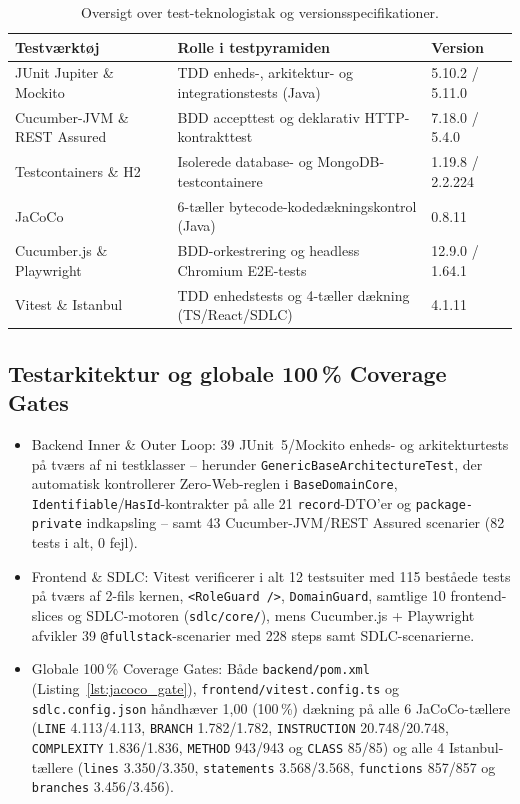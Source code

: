 \documentclass[11pt,a4paper]{article}
\begin{document}
\begin{table}[htbp]
\begin{table}[htbp]
\centering
\small
\begin{tabularx}{\textwidth}{P{4.2cm} Y P{2.4cm}}
\toprule
\textbf{Testværktøj} & \textbf{Rolle i testpyramiden} & \textbf{Version} \\
\midrule
JUnit Jupiter \& Mockito & TDD enheds-, arkitektur- og integrationstests (Java) & 5.10.2 / 5.11.0 \\
Cucumber-JVM \& REST Assured & BDD accepttest og deklarativ HTTP-kontrakttest & 7.18.0 / 5.4.0 \\
Testcontainers \& H2 & Isolerede database- og MongoDB-testcontainere & 1.19.8 / 2.2.224 \\
JaCoCo & 6-tæller bytecode-kodedækningskontrol (Java) & 0.8.11 \\
Cucumber.js \& Playwright & BDD-orkestrering og headless Chromium E2E-tests & 12.9.0 / 1.64.1 \\
Vitest \& Istanbul & TDD enhedstests og 4-tæller dækning (TS/React/SDLC) & 4.1.11 \\
\bottomrule
\end{tabularx}
\caption{Oversigt over test-teknologistak og versionsspecifikationer.}
\label{tab:test_stack}
\end{table}

\subsection{Testarkitektur og globale 100\,\% Coverage Gates}
\begin{itemize}[noitemsep]
    \item Backend Inner \& Outer Loop: 39 JUnit~5/Mockito enheds- og arkitekturtests på tværs af ni testklasser -- herunder \texttt{GenericBaseArchitectureTest}, der automatisk kontrollerer Zero-Web-reglen i \texttt{BaseDomainCore}, \texttt{Identifiable}/\texttt{HasId}-kontrakter på alle 21 \texttt{record}-DTO'er og \texttt{package-private} indkapsling -- samt 43 Cucumber-JVM/REST Assured scenarier (82 tests i alt, 0 fejl).
    \item Frontend \& SDLC: Vitest verificerer i alt 12 testsuiter med 115 beståede tests på tværs af 2-fils kernen, \texttt{<RoleGuard />}, \texttt{DomainGuard}, samtlige 10 frontend-slices og SDLC-motoren (\texttt{sdlc/core/}), mens Cucumber.js + Playwright afvikler 39 \texttt{@fullstack}-scenarier med 228 steps samt SDLC-scenarierne.
    \item Globale 100\,\% Coverage Gates: Både \texttt{backend/pom.xml} (Listing~\ref{lst:jacoco_gate}), \texttt{frontend/\allowbreak vitest.config.ts} og \texttt{sdlc.config.json} håndhæver 1,00 (100\,\%) dækning på alle 6 JaCoCo-tællere (\texttt{LINE} 4.113/4.113, \texttt{BRANCH} 1.782/1.782, \texttt{INSTRUCTION} 20.748/20.748, \texttt{COMPLEXITY} 1.836/1.836, \texttt{METHOD} 943/943 og \texttt{CLASS} 85/85) og alle 4 Istanbul-tællere (\texttt{lines} 3.350/3.350, \texttt{statements} 3.568/3.568, \texttt{functions} 857/857 og \texttt{branches} 3.456/3.456).
\end{itemize}


\end{table}
\end{document}
